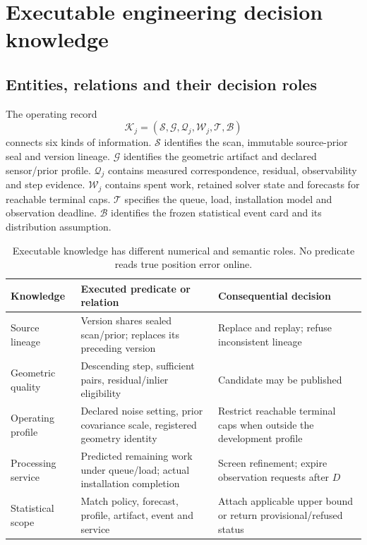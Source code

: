 
\section{Executable engineering decision knowledge}\label{sec:knowledge}
\subsection{Entities, relations and their decision roles}
The operating record
\begin{equation}
\mathcal K_j=(\mathcal S,\mathcal G,\mathcal Q_j,\mathcal W_j,
\mathcal T,\mathcal B)\label{eq:knowledge-record}
\end{equation}
connects six kinds of information. $\mathcal S$ identifies the scan, immutable source-prior seal and version lineage. $\mathcal G$ identifies the geometric artifact and declared sensor/prior profile. $\mathcal Q_j$ contains measured correspondence, residual, observability and step evidence. $\mathcal W_j$ contains spent work, retained solver state and forecasts for reachable terminal caps. $\mathcal T$ specifies the queue, load, installation model and observation deadline. $\mathcal B$ identifies the frozen statistical event card and its distribution assumption.

\begin{table}[t]\centering\small
\caption{Executable knowledge has different numerical and semantic roles. No predicate reads true position error online.}\label{tab:knowledge}
\begin{tabularx}{\linewidth}{@{}lXX@{}}\toprule
Knowledge & Executed predicate or relation & Consequential decision\\\midrule
Source lineage & Version shares sealed scan/prior; replaces its preceding version & Replace and replay; refuse inconsistent lineage\\
Geometric quality & Descending step, sufficient pairs, residual/inlier eligibility & Candidate may be published\\
Operating profile & Declared noise setting, prior covariance scale, registered geometry identity & Restrict reachable terminal caps when outside the development profile\\
Processing service & Predicted remaining work under queue/load; actual installation completion & Screen refinement; expire observation requests after $D$\\
Statistical scope & Match policy, forecast, profile, artifact, event and service & Attach applicable upper bound or return provisional/refused status\\\bottomrule
\end{tabularx}
\end{table}

